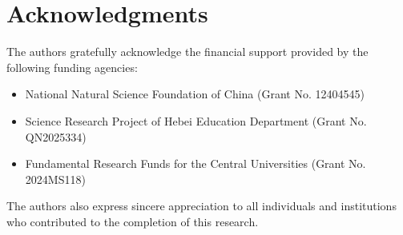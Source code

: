\documentclass[12pt]{article}
\begin{document}
	
	\section*{Acknowledgments}
	
	The authors gratefully acknowledge the financial support provided by the following funding agencies:
	
	\begin{itemize}
		\item National Natural Science Foundation of China (Grant No. 12404545)
		\item Science Research Project of Hebei Education Department (Grant No. QN2025334)
		\item Fundamental Research Funds for the Central Universities (Grant No. 2024MS118)
	\end{itemize}
	
	The authors also express sincere appreciation to all individuals and institutions who contributed to the completion of this research.
	
\end{document}
